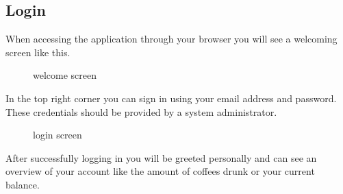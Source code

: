 \subsection{Login}\label{login-1}

When accessing the application through your browser you will see a
welcoming screen like this.

\begin{figure}[htbp]
\centering
{}
\caption{welcome screen}
\end{figure}

In the top right corner you can sign in using your email address and
password. These credentials should be provided by a system
administrator.

\begin{figure}[htbp]
\centering
{}
\caption{login screen}
\end{figure}

After successfully logging in you will be greeted personally and can see
an overview of your account like the amount of coffees drunk or your
current balance.

